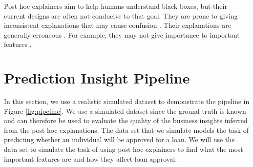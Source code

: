 \documentclass[12pt]{article}    %
\begin{document}
Post hoc explainers aim to help humans understand black boxes, but their current designs are often not conducive to that goal. They are prone to giving inconsistent explanations that may cause confusion \citep{Barocas20assumptions,bansal20sam,molnar2019,alvarez18robustness,laugel18defining,artelt21evaluating}. Their explanations are generally erroneous \citep{rahnama19shift,kumar20shap}. For example, they may not give importance to important features \citep{garreau20theoretical}.%

    



\section*{Prediction Insight Pipeline}
\label{sec:dataset}
In this section, we use a realistic simulated dataset to demonstrate the pipeline in Figure \ref{fig:pipeline}. We use a simulated dataset since the ground truth is known and can therefore be used to evaluate the quality of the business insights inferred from the post hoc explanations. The data set that we simulate models the task of predicting whether an individual will be approved for a loan. We will use the data set to simulate the task of using post hoc explainers to find what the most important features are and how they affect loan approval.

 
\end{document}

